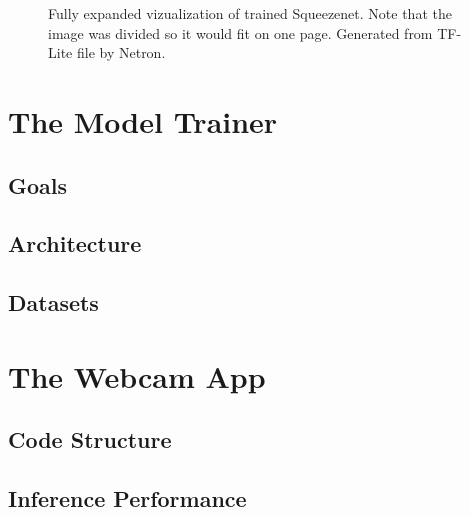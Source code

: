 \begin{figure}[!tbp]
\caption{Fully expanded vizualization of trained Squeezenet. Note that the image was divided so it would fit on one page. Generated from TF-Lite file by Netron. \cite{netron}}
\label{netron_sqnet}
\end{figure}


\section{The Model Trainer}
\subsection{Goals}
\subsection{Architecture}
\subsection{Datasets}
\section{The Webcam App}
\subsection{Code Structure}
\subsection{Inference Performance}
